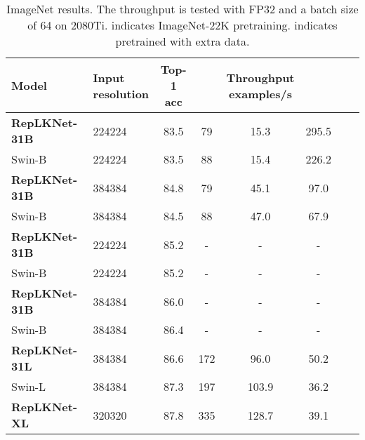 \documentclass[10pt,twocolumn,letterpaper]{article}
\begin{document}
	\setlength{\tabcolsep}{2pt}
	\begin{table}
		\caption{ImageNet results. The throughput is tested with FP32 and a batch size of 64 on 2080Ti.  indicates ImageNet-22K pretraining.  indicates pretrained with extra data.}
		\label{table-to-swin}
		\vspace{-0.25in}
		\begin{center}		
			\small
			\begin{tabular}{llcccccc}
				\hline
				Model			& \makecell{Input \\ resolution}& \makecell{Top-1 \\ acc}	&	\makecell{Params \G)} & \makecell{Throughput\\examples/s}\\
				\hline
				\textbf{RepLKNet-31B}     &	224224 & 	83.5            &   79   & 15.3 & 295.5\\
				Swin-B     	&	224224&   	83.5    		&	88		& 15.4	    &  226.2 \\
				\hline
				\textbf{RepLKNet-31B}     &	384384& 	84.8            &   79   	& 45.1 & 97.0   \\
				Swin-B     	&	384384&   	84.5    		&	88		& 47.0	    & 67.9\\
				\hline
				\textbf{RepLKNet-31B}~     &	224224 & 	85.2            &   -  & - & - \\
				Swin-B~     	&	224224&   	85.2    		&	-		& -	    &  - \\
				\hline
				\textbf{RepLKNet-31B}~     &	384384& 	86.0            &   -   	& - & -   \\
				Swin-B~     	&	384384&   	86.4    		&	-		& -	    & -\\
				\hline
				\textbf{RepLKNet-31L}~   &	384384& 	86.6  &   172 &   96.0 &   50.2               \\
				Swin-L~ 	       &	384384&    87.3    &    197 &103.9 &   36.2 	                \\
				
				\hline
				\textbf{RepLKNet-XL}~ & 320320 & 87.8 & 335 & 128.7 & 39.1 \\
				\hline
			\end{tabular}
		\end{center}
		\vspace{-0.25in}
	\end{table}

	
	
\end{document}
